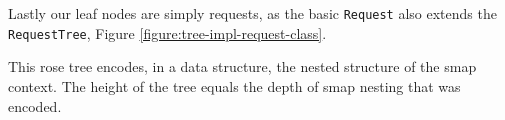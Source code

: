 Lastly our leaf nodes are simply requests, as the basic \texttt{Request} also extends the \texttt{RequestTree}, Figure \ref{figure:tree-impl-request-class}.

This rose tree encodes, in a data structure, the nested structure of the smap context.
The height of the tree equals the depth of smap nesting that was encoded.
